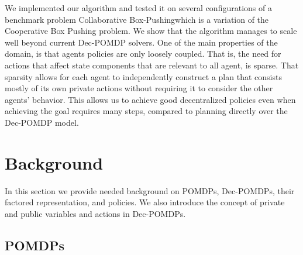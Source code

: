 \documentclass[letterpaper]{article} %
\newcommand{\cbp}[0]{Collaborative Box-Pushing}
\begin{document}
We implemented our algorithm and tested it on several configurations of a benchmark problem \cbp which is a variation of the Cooperative Box Pushing problem. We show that the algorithm manages to scale well beyond
current Dec-POMDP solvers.
One of the main properties of the domain, is that agents policies are only loosely coupled. That is, the need for actions that affect state components that are relevant to all agent, is sparse. That sparsity allows for each agent to independently construct a plan that consists mostly of its own private actions without requiring it to consider the other agents' behavior. This allows us to achieve good decentralized policies even when achieving the goal requires many steps, compared to planning directly over the Dec-POMDP model.

\section{Background}

In this section we provide needed background on POMDPs, Dec-POMDPs, their factored representation,
and policies. We also introduce the concept of private and public variables and actions in Dec-POMDPs.

\subsection{POMDPs}
\end{document}
